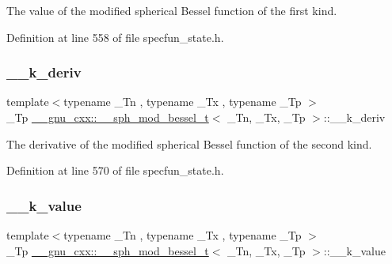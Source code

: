 The value of the modified spherical Bessel function of the first kind. 



Definition at line 558 of file specfun\+\_\+state.\+h.

\mbox{\label{struct____gnu__cxx_1_1____sph__mod__bessel__t_a4a291581457934e9d05c21e2acbedbc5}} 
\subsubsection{\texorpdfstring{\+\_\+\+\_\+k\+\_\+deriv}{\_\_k\_deriv}}
{\footnotesize\ttfamily template$<$typename \+\_\+\+Tn , typename \+\_\+\+Tx , typename \+\_\+\+Tp $>$ \\
\+\_\+\+Tp \hyperlink{struct____gnu__cxx_1_1____sph__mod__bessel__t}{\+\_\+\+\_\+gnu\+\_\+cxx\+::\+\_\+\+\_\+sph\+\_\+mod\+\_\+bessel\+\_\+t}$<$ \+\_\+\+Tn, \+\_\+\+Tx, \+\_\+\+Tp $>$\+::\+\_\+\+\_\+k\+\_\+deriv}



The derivative of the modified spherical Bessel function of the second kind. 



Definition at line 570 of file specfun\+\_\+state.\+h.

\mbox{\label{struct____gnu__cxx_1_1____sph__mod__bessel__t_af0e430aef3e7053de5474206d6f13830}} 
\subsubsection{\texorpdfstring{\+\_\+\+\_\+k\+\_\+value}{\_\_k\_value}}
{\footnotesize\ttfamily template$<$typename \+\_\+\+Tn , typename \+\_\+\+Tx , typename \+\_\+\+Tp $>$ \\
\+\_\+\+Tp \hyperlink{struct____gnu__cxx_1_1____sph__mod__bessel__t}{\+\_\+\+\_\+gnu\+\_\+cxx\+::\+\_\+\+\_\+sph\+\_\+mod\+\_\+bessel\+\_\+t}$<$ \+\_\+\+Tn, \+\_\+\+Tx, \+\_\+\+Tp $>$\+::\+\_\+\+\_\+k\+\_\+value}



